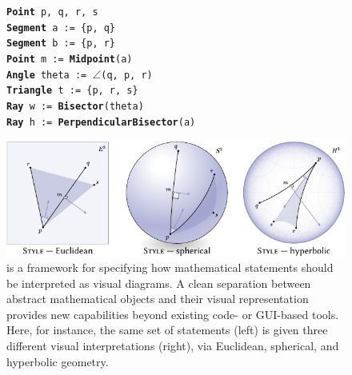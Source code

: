 \begin{figure}[h]
  \centering
\begin{minipage}{120pt}
   \fontsize{7pt}{8pt}\selectfont
   \texttt{\textbf{Point} p, q, r, s} \\
   \texttt{\textbf{Segment} a := \{p, q\}} \\
   \texttt{\textbf{Segment} b := \{p, r\}} \\
   \texttt{\textbf{Point} m := \textbf{Midpoint}(a)} \\
   \texttt{\textbf{Angle} theta := $\angle$(q, p, r)} \\
   \texttt{\textbf{Triangle} t := \{p, r, s\}} \\
   \texttt{\textbf{Ray} w := \textbf{Bisector}(theta)} \\
   \texttt{\textbf{Ray} h := \textbf{PerpendicularBisector}(a)} \\
\end{minipage}%
\hspace{0pt}%
\begin{minipage}{340pt}
   \includegraphics{assets/penrose/teaser.pdf}
\end{minipage}
   \caption{\Penrose{} is a framework for specifying how mathematical statements should be interpreted as visual diagrams.  A clean separation between abstract mathematical objects and their visual representation provides new capabilities beyond existing code- or GUI-based tools.  Here, for instance, the same set of statements (left) is given three different visual interpretations (right), via Euclidean, spherical, and hyperbolic geometry.
   \label{fig:penrose-teaser}
   }
\end{figure}

